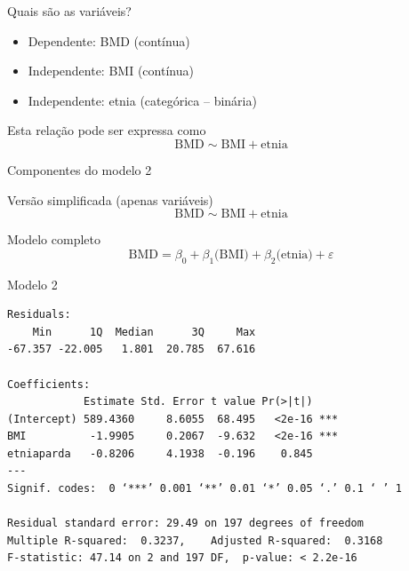 \documentclass{beamer}
\begin{document}
\begin{frame}{\scriptsize Quais são as variáveis?}
  \begin{itemize}
    \footnotesize
  \item Dependente: BMD (contínua)
  \item Independente: BMI (contínua)
  \item Independente: etnia (categórica -- binária)
  \end{itemize}
  \vfill
  \begin{block}{Esta relação pode ser expressa como}
    \footnotesize
    \begin{displaymath}
      \text{BMD} \sim \text{BMI} + \text{etnia}
    \end{displaymath}
  \end{block}
\end{frame}

\begin{frame}{\scriptsize Componentes do modelo 2}
  \begin{block}{\footnotesize Versão simplificada (apenas variáveis)}
    \footnotesize
    \begin{displaymath}
      \text{BMD} \sim \text{BMI} + \text{etnia}
    \end{displaymath}
  \end{block}
  \bigskip
  \bigskip
  \begin{block}{Modelo completo}
    \begin{displaymath}
      \text{BMD} =\beta_0 + \beta_1 \text{(BMI)} + \beta_2 \text{(etnia)} +\varepsilon
    \end{displaymath}
  \end{block}
  \vfill
\end{frame}

\begin{frame}[fragile]{\scriptsize }
  \begin{center}
    \begin{exampleblock}{Modelo 2}
      \tiny
\begin{verbatim}
Residuals:
    Min      1Q  Median      3Q     Max 
-67.357 -22.005   1.801  20.785  67.616

Coefficients:
            Estimate Std. Error t value Pr(>|t|)    
(Intercept) 589.4360     8.6055  68.495   <2e-16 ***
BMI          -1.9905     0.2067  -9.632   <2e-16 ***
etniaparda   -0.8206     4.1938  -0.196    0.845
---
Signif. codes:  0 ‘***’ 0.001 ‘**’ 0.01 ‘*’ 0.05 ‘.’ 0.1 ‘ ’ 1

Residual standard error: 29.49 on 197 degrees of freedom
Multiple R-squared:  0.3237,	Adjusted R-squared:  0.3168
F-statistic: 47.14 on 2 and 197 DF,  p-value: < 2.2e-16
\end{verbatim}
    \end{exampleblock}
  \end{center}
\end{frame}
\end{document}
